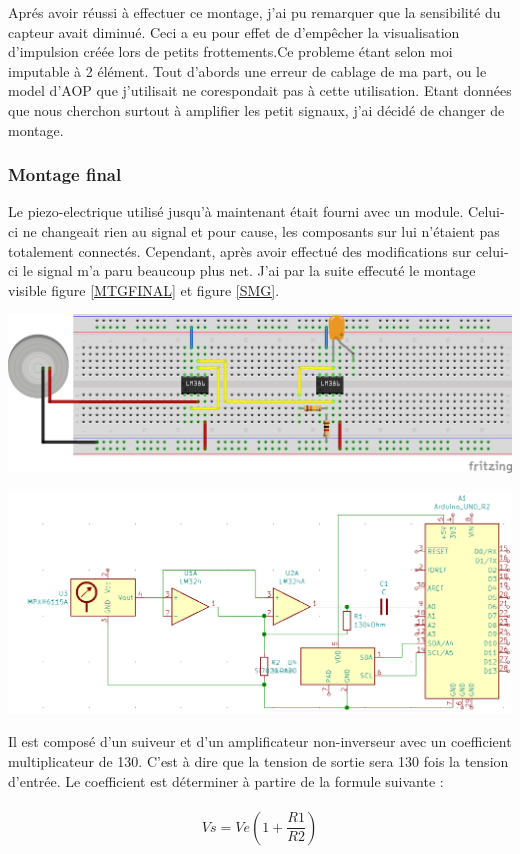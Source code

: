 \documentclass[12pt,french,a4paper]{article}
\begin{document}
Aprés avoir réussi à effectuer ce montage, j’ai pu remarquer que la sensibilité du capteur avait diminué. Ceci a eu pour effet de d’empêcher la visualisation d’impulsion créée lors de petits frottements.Ce probleme étant selon moi imputable à 2 élément. Tout d'abords une erreur de cablage de ma part, ou le model d'AOP que j'utilisait ne corespondait pas à cette utilisation. Etant données que nous cherchon surtout à amplifier les petit signaux, j’ai décidé de changer de montage.

\subsubsection{Montage final}
Le piezo-electrique utilisé jusqu’à maintenant était fourni avec un module. Celui-ci ne changeait rien au signal et pour cause, les composants sur lui n’étaient pas totalement connectés. Cependant, après avoir effectué des modifications sur celui-ci le signal m'a paru beaucoup plus net.
J’ai par la suite effecuté le montage visible figure \ref{MTGFINAL} et figure \ref{SMG}.
\\
\begin{center}	
\includegraphics[scale=0.85]{../img/mtgfinal.png}
\label{MTGFINAL}
\end{center}

\begin{center}
    \includegraphics[scale=0.5]{../img/SMG.png}
    \label{SMG}
\end{center}
Il est composé d’un suiveur et d’un amplificateur non-inverseur avec un coefficient multiplicateur de 130. C'est à dire que la tension de sortie sera 130 fois la tension d'entrée. Le coefficient est déterminer à partire de la formule suivante : \\ \\
\[
	Vs = Ve (1 + \frac{R1}{R2})
\]
\end{document}
